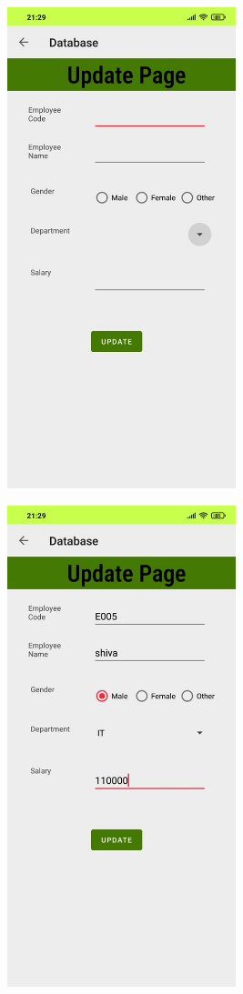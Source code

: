 \documentclass[12pt,letterpaper]{article}
\begin{document}
\subsubsection*{}
\begin{figure}[h]
    \centering
    \includegraphics[height=14cm, keepaspectratio]{Outputs/OP6.png}
\end{figure}
\begin{figure}
    \centering
    \includegraphics[height=14cm, keepaspectratio]{Outputs/OP7.png}
\end{figure}
\end{document}
